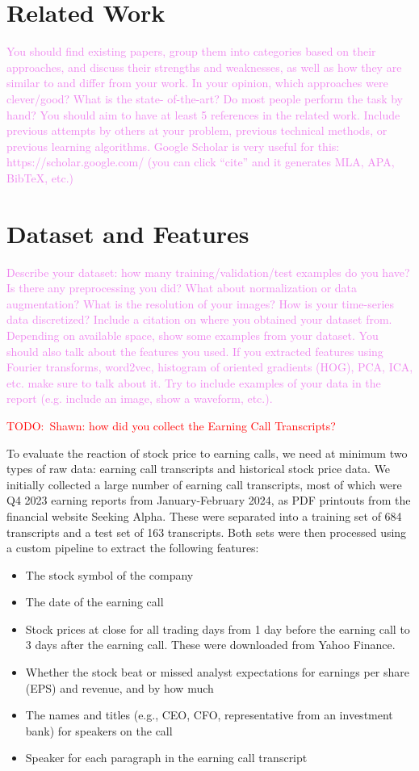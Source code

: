 \documentclass{article}
\newcommand{\instructions}[1]{\textcolor{violet}{{#1}}}
\newcommand{\TODO}[1]{\textcolor{red}{{TODO:~#1}}}
\begin{document}
\section{Related Work}
\instructions{%
You should find existing papers, group them into categories based on their approaches, and discuss their strengths and weaknesses, as well as how they are similar to and differ from your work. In your opinion, which approaches were clever/good? What is the state- of-the-art? Do most people perform the task by hand? You should aim to have at least 5 references in the related work. Include previous attempts by others at your problem, previous technical methods, or previous learning algorithms. Google Scholar is very useful for this: https://scholar.google.com/ (you can click “cite” and it generates MLA, APA, BibTeX, etc.)
}

\section{Dataset and Features}
\instructions{%
Describe your dataset: how many training/validation/test examples do you have? Is there any preprocessing you did? What about normalization or data augmentation? What is the resolution of your images? How is your time-series data discretized? Include a citation on where you obtained your dataset from. Depending on available space, show some examples from your dataset. You should also talk about the features you used. If you extracted features using Fourier transforms, word2vec, histogram of oriented gradients (HOG), PCA, ICA, etc. make sure to talk about it. Try to include examples of your data in the report (e.g. include an image, show a waveform, etc.).
}

\TODO{Shawn: how did you collect the Earning Call Transcripts?}

To evaluate the reaction of stock price to earning calls, we need at minimum two types of raw data: earning call transcripts and historical stock price data.
We initially collected a large number of earning call transcripts, most of which were Q4 2023 earning reports from January-February 2024, as PDF printouts from the financial website Seeking Alpha.
These were separated into a training set of 684 transcripts and a test set of 163 transcripts.
Both sets were then processed using a custom pipeline to extract the following features:
\begin{itemize}
  \item The stock symbol of the company
  \item The date of the earning call
  \item Stock prices at close for all trading days from 1 day before the earning call to 3 days after the earning call. These were downloaded from Yahoo Finance.
  \item Whether the stock beat or missed analyst expectations for earnings per share (EPS) and revenue, and by how much
  \item The names and titles (e.g., CEO, CFO, representative from an investment bank) for speakers on the call
  \item Speaker for each paragraph in the earning call transcript
\end{itemize}
\end{document}
